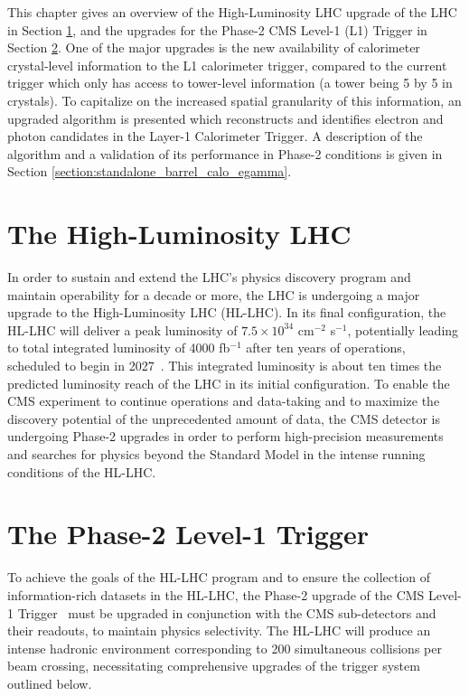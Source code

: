This chapter gives an overview of the High-Luminosity LHC upgrade of the LHC in Section \ref{section:hl-lhc}, and the upgrades for the Phase-2 CMS Level-1 (L1) Trigger in Section \ref{section:phase-2-l1t}. One of the major upgrades is the new availability of calorimeter crystal-level information to the L1 calorimeter trigger, compared to the current trigger which only has access to tower-level information (a tower being 5 by 5 in crystals). To capitalize on the increased spatial granularity of this information, an upgraded algorithm is presented which reconstructs and identifies electron and photon candidates in the Layer-1 Calorimeter Trigger. A description of the algorithm and a validation of its performance in Phase-2 conditions is given in Section \ref{section:standalone_barrel_calo_egamma}.

\section{The High-Luminosity LHC}
\label{section:hl-lhc}
In order to sustain and extend the LHC's physics discovery program and maintain operability for a decade or more, the LHC is undergoing a major upgrade to the High-Luminosity LHC (HL-LHC). In its final configuration, the HL-LHC will deliver a peak luminosity of $7.5 \times 10^{34}$ cm$^{-2}$ s$^{-1}$, potentially leading to total integrated luminosity of 4000 fb$^{-1}$ after ten years of operations, scheduled to begin in 2027~\cite{CMS-TDR-021}. This integrated luminosity is about ten times the predicted luminosity reach of the LHC in its initial configuration. To enable the CMS experiment to continue operations and data-taking and to maximize the discovery potential of the unprecedented amount of data, the CMS detector is undergoing Phase-2 upgrades in order to perform high-precision measurements and searches for physics beyond the Standard Model in the intense running conditions of the HL-LHC. 

\section{The Phase-2 Level-1 Trigger}
\label{section:phase-2-l1t}
To achieve the goals of the HL-LHC program and to ensure the collection of information-rich datasets in the HL-LHC, the Phase-2 upgrade of the CMS Level-1 Trigger~\cite{CMS-TDR-021} must be upgraded in conjunction with the CMS sub-detectors and their readouts, to maintain physics selectivity. The HL-LHC will produce an intense hadronic environment corresponding to 200 simultaneous collisions per beam crossing, necessitating comprehensive upgrades of the trigger system outlined below.

